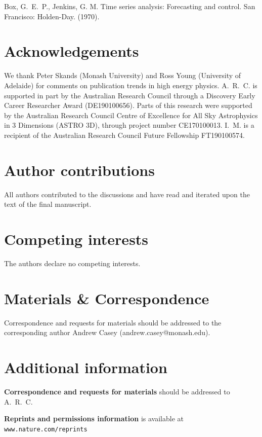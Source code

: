 \documentclass[a4paper,12pt]{article}
\begin{document}
 
 
\begin{thebibliography}{10}

\setcounter{enumiv}{16}

{Box, G.~E.~P., Jenkins, G. M.} Time series analysis: Forecasting and control. San Francisco: Holden-Day. \newblock (1970).

\end{thebibliography}


\section*{Acknowledgements}
We thank Peter Skands (Monash University) 
	 and Ross Young (University of Adelaide) 
for comments on publication trends in high energy physics.
A.~R.~C. is supported in part by the Australian Research Council through a Discovery Early Career Researcher Award (DE190100656). 
Parts of this research were supported by the Australian Research Council Centre of Excellence for All Sky Astrophysics in 3 Dimensions (ASTRO 3D), through project number CE170100013.
I.~M. is a recipient of the Australian Research Council Future Fellowship FT190100574.


\section*{Author contributions}

All authors contributed to the discussions and have read and iterated upon the text of the final manuscript. 

\section*{Competing interests}
The authors declare no competing interests. 

\section*{Materials \& Correspondence}
Correspondence and requests for materials should be addressed to the corresponding author Andrew Casey (andrew.casey@monash.edu).

\section*{Additional information}


\noindent\textbf{Correspondence and requests for materials} should be addressed to A.~R.~C.

\noindent\textbf{Reprints and permissions information} is available at {\tt\small www.nature.com/reprints}
\end{document}
